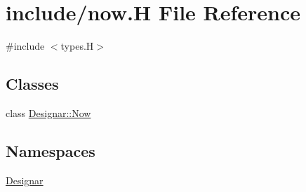 \hypertarget{now_8_h}{}\section{include/now.H File Reference}
\label{now_8_h}
{\ttfamily \#include $<$types.\+H$>$}\newline
\subsection*{Classes}
\begin{DoxyCompactItemize}
\item 
class \hyperlink{class_designar_1_1_now}{Designar\+::\+Now}
\end{DoxyCompactItemize}
\subsection*{Namespaces}
\begin{DoxyCompactItemize}
\item 
 \hyperlink{namespace_designar}{Designar}
\end{DoxyCompactItemize}
